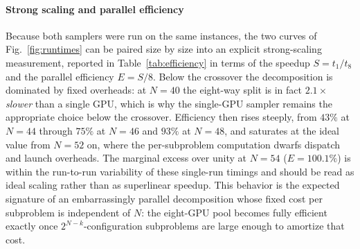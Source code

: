 \documentclass[12pt,a4paper]{elsarticle}
\begin{document}
\paragraph{Strong scaling and parallel efficiency}
Because both samplers were run on the same instances, the two curves of
Fig.~\ref{fig:runtimes} can be paired size by size into an explicit
strong-scaling measurement, reported in Table~\ref{tab:efficiency} in terms of
the speedup $S=t_1/t_8$ and the parallel efficiency $E=S/8$. Below the crossover
the decomposition is dominated by fixed overheads: at $N=40$ the eight-way split
is in fact $2.1\times$ \emph{slower} than a single GPU, which is why the
single-GPU sampler remains the appropriate choice below the crossover.
Efficiency then rises steeply, from $43\%$ at $N=44$ through $75\%$ at $N=46$ and
$93\%$ at $N=48$, and saturates at the ideal value from $N=52$ on, where the
per-subproblem computation dwarfs dispatch and launch overheads. The marginal
excess over unity at $N=54$ ($E=100.1\%$) is within the run-to-run variability of
these single-run timings and should be read as ideal scaling rather than as
superlinear speedup. This behavior is the expected signature of an
embarrassingly parallel decomposition whose fixed cost per subproblem is
independent of $N$: the eight-GPU pool becomes fully efficient exactly once
$2^{N-k}$-configuration subproblems are large enough to amortize that cost.
\end{document}
